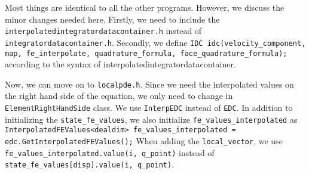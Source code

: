  Most things are identical to all the other programs. However, we discuss the minor changes needed here. 
 Firstly, we need to include the \texttt{interpolatedintegratordatacontainer.h} instead of \texttt{integratordatacontainer.h}.
 Secondly, we define \texttt{IDC idc(velocity\_component, map, fe\_interpolate, quadrature\_formula, face\_quadrature\_formula);}
 according to the syntax of interpolatedintegratordatacontainer. \par
 Now, we can move on to \texttt{localpde.h}. Since we need the interpolated values on the right hand
 side of the equation, we only need to change in \texttt{ElementRightHandSide} class. We use \texttt{InterpEDC} instead of 
 \texttt{EDC}. In addition to initializing the \texttt{state\_fe\_values}, we also initialize \texttt{fe\_values\_interpolated} as \\
 \texttt{InterpolatedFEValues<dealdim> fe\_values\_interpolated = edc.GetInterpolatedFEValues();} 
 When adding the \texttt{local\_vector}, we use \\ \texttt{fe\_values\_interpolated.value(i, q\_point)} instead of 
 \texttt{state\_fe\_values[disp].value(i, q\_point)}.

   


